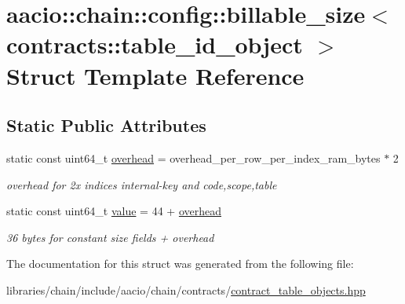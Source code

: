 \hypertarget{structaacio_1_1chain_1_1config_1_1billable__size_3_01contracts_1_1table__id__object_01_4}{}\section{aacio\+:\+:chain\+:\+:config\+:\+:billable\+\_\+size$<$ contracts\+:\+:table\+\_\+id\+\_\+object $>$ Struct Template Reference}
\label{structaacio_1_1chain_1_1config_1_1billable__size_3_01contracts_1_1table__id__object_01_4}
\subsection*{Static Public Attributes}
\begin{DoxyCompactItemize}
\item 
\mbox{\label{structaacio_1_1chain_1_1config_1_1billable__size_3_01contracts_1_1table__id__object_01_4_a2434fd43f487446a065bcfe7ddcd1198}} 
static const uint64\+\_\+t \mbox{\hyperlink{structaacio_1_1chain_1_1config_1_1billable__size_3_01contracts_1_1table__id__object_01_4_a2434fd43f487446a065bcfe7ddcd1198}{overhead}} = overhead\+\_\+per\+\_\+row\+\_\+per\+\_\+index\+\_\+ram\+\_\+bytes $\ast$ 2
\begin{DoxyCompactList}\small\item\em overhead for 2x indices internal-\/key and code,scope,table \end{DoxyCompactList}\item 
\mbox{\label{structaacio_1_1chain_1_1config_1_1billable__size_3_01contracts_1_1table__id__object_01_4_ad9af83a7aef8a8080718571a6ca55ac4}} 
static const uint64\+\_\+t \mbox{\hyperlink{structaacio_1_1chain_1_1config_1_1billable__size_3_01contracts_1_1table__id__object_01_4_ad9af83a7aef8a8080718571a6ca55ac4}{value}} = 44 + \mbox{\hyperlink{structaacio_1_1chain_1_1config_1_1billable__size_3_01contracts_1_1table__id__object_01_4_a2434fd43f487446a065bcfe7ddcd1198}{overhead}}
\begin{DoxyCompactList}\small\item\em 36 bytes for constant size fields + overhead \end{DoxyCompactList}\end{DoxyCompactItemize}


The documentation for this struct was generated from the following file\+:\begin{DoxyCompactItemize}
\item 
libraries/chain/include/aacio/chain/contracts/\mbox{\hyperlink{contract__table__objects_8hpp}{contract\+\_\+table\+\_\+objects.\+hpp}}\end{DoxyCompactItemize}
